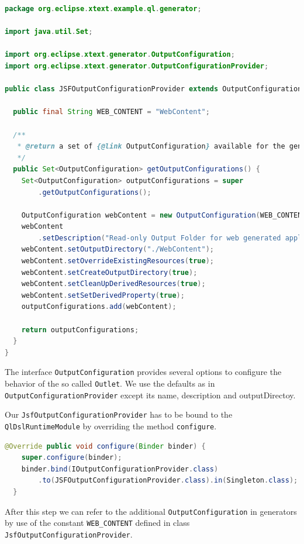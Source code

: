 \begin{lstlisting}[language=Java]
package org.eclipse.xtext.example.ql.generator;

import java.util.Set;

import org.eclipse.xtext.generator.OutputConfiguration;
import org.eclipse.xtext.generator.OutputConfigurationProvider;

public class JSFOutputConfigurationProvider extends OutputConfigurationProvider {

  public final String WEB_CONTENT = "WebContent";

  /**
   * @return a set of {@link OutputConfiguration} available for the generator
   */
  public Set<OutputConfiguration> getOutputConfigurations() {
    Set<OutputConfiguration> outputConfigurations = super
        .getOutputConfigurations();

    OutputConfiguration webContent = new OutputConfiguration(WEB_CONTENT);
    webContent
        .setDescription("Read-only Output Folder for web generated application artifacts");
    webContent.setOutputDirectory("./WebContent");
    webContent.setOverrideExistingResources(true);
    webContent.setCreateOutputDirectory(true);
    webContent.setCleanUpDerivedResources(true);
    webContent.setSetDerivedProperty(true);
    outputConfigurations.add(webContent);

    return outputConfigurations;
  }
}
\end{lstlisting}

The interface \texttt{OutputConfiguration} provides several options to configure
the behavior of the so called \texttt{Outlet}. We use the defaults as in
\texttt{OutputConfigurationProvider} except its name, description and outputDirectoy.

Our \texttt{JsfOutputConfigurationProvider} has to be bound to the
\texttt{QlDslRuntimeModule} by overriding the method \texttt{configure}. 

\begin{lstlisting}[language=Java]
@Override public void configure(Binder binder) {
    super.configure(binder);
    binder.bind(IOutputConfigurationProvider.class)
        .to(JSFOutputConfigurationProvider.class).in(Singleton.class);
  }
 \end{lstlisting}
 
After this step we can refer to the additional \texttt{OutputConfiguration} in
generators by use of the constant \texttt{WEB\_CONTENT} defined in class
\texttt{JsfOutputConfigurationProvider}.

